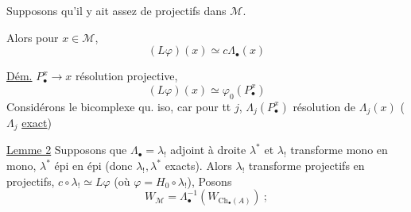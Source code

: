 Supposons qu'il y ait assez de projectifs dans $\mathcal M$.

Alors pour  $x\in\mathcal M$,
\[
(L\varphi)(x)\simeq c\Lambda_\bullet(x)
\]

\uline{Dém.} 
$P_\bullet^x\longrightarrow x$ résolution projective,
\[
(L\varphi)(x)\simeq\varphi_0(P_\bullet^x)
\]
 Considérons le bicomplexe
qu. iso, car pour tt $j$, $\Lambda_j(P_\bullet^x)$
\deleted{\unsure{$\longrightarrow$}} résolution de $\Lambda_j(x)$
($\Lambda_j$ \uline{exact})


\uline{Lemme 2} Supposons que $\Lambda_\bullet=\lambda_!$
 adjoint à droite
 $\lambda^*$ et $\lambda_!$ transforme mono en mono,
$\lambda^*$ épi en épi (donc $\lambda_!,\lambda^*$ exacts).
Alors $\lambda_!$ transforme projectifs en projectifs,
$c\circ\lambda_!\simeq L\varphi$ (où $\varphi=H_0\circ\lambda_!$),
Posons
\[
W_{\mathcal M}=\Lambda_\bullet^{-1}(W_{\mathrm{Ch}_\bullet(A)})\ ;
\]

